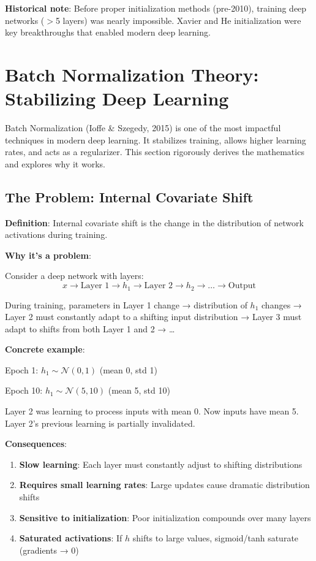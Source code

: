 \documentclass[11pt,oneside]{book}
\begin{document}
\textbf{Historical note}: Before proper initialization methods (pre-2010), training deep networks ($>$5 layers) was nearly impossible. Xavier and He initialization were key breakthroughs that enabled modern deep learning.

\section{Batch Normalization Theory: Stabilizing Deep Learning}

Batch Normalization (Ioffe \& Szegedy, 2015) is one of the most impactful techniques in modern deep learning. It stabilizes training, allows higher learning rates, and acts as a regularizer. This section rigorously derives the mathematics and explores why it works.

\subsection{The Problem: Internal Covariate Shift}

\textbf{Definition}: Internal covariate shift is the change in the distribution of network activations during training.

\textbf{Why it's a problem}:

Consider a deep network with layers:
\[
x \to \text{Layer 1} \to h_1 \to \text{Layer 2} \to h_2 \to \ldots \to \text{Output}
\]

During training, parameters in Layer 1 change → distribution of $h_1$ changes → Layer 2 must constantly adapt to a shifting input distribution → Layer 3 must adapt to shifts from both Layer 1 and 2 → \ldots

\textbf{Concrete example}:

Epoch 1: $h_1 \sim \mathcal{N}(0, 1)$ (mean 0, std 1)

Epoch 10: $h_1 \sim \mathcal{N}(5, 10)$ (mean 5, std 10)

Layer 2 was learning to process inputs with mean 0. Now inputs have mean 5. Layer 2's previous learning is partially invalidated.

\textbf{Consequences}:
\begin{enumerate}
\item \textbf{Slow learning}: Each layer must constantly adjust to shifting distributions
\item \textbf{Requires small learning rates}: Large updates cause dramatic distribution shifts
\item \textbf{Sensitive to initialization}: Poor initialization compounds over many layers
\item \textbf{Saturated activations}: If $h$ shifts to large values, sigmoid/tanh saturate (gradients → 0)
\end{enumerate}
\end{document}
